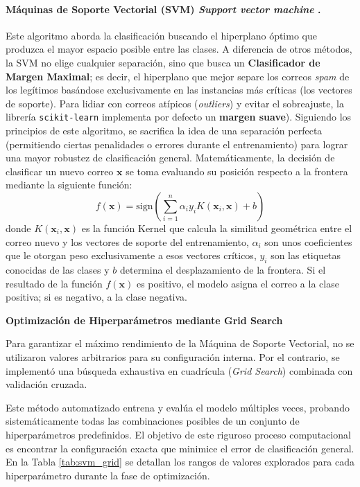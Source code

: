 \documentclass[a4paper,11pt]{book}
\begin{document}
\paragraph{Máquinas de Soporte Vectorial (SVM) \textit{Support vector machine  }.} Este algoritmo aborda la clasificación buscando el hiperplano óptimo que produzca el mayor espacio posible entre las clases. A diferencia de otros métodos, la SVM no elige cualquier separación, sino que busca un \textbf{Clasificador de Margen Maximal}; es decir, el hiperplano que mejor separe los correos \textit{spam} de los legítimos basándose exclusivamente en las instancias más críticas (los vectores de soporte).
Para lidiar con correos atípicos (\textit{outliers}) y evitar el sobreajuste, la librería \texttt{scikit-learn} implementa por defecto un \textbf{margen suave}). Siguiendo los principios de este algoritmo, se sacrifica la idea de una separación perfecta (permitiendo ciertas penalidades o errores durante el entrenamiento) para lograr una mayor robustez de clasificación general.
Matemáticamente, la decisión de clasificar un nuevo correo $\boldsymbol{x}$ se toma evaluando su posición respecto a la frontera mediante la siguiente función:
\begin{equation}
f(\boldsymbol{x}) = \text{sign}\left( \sum_{i=1}^{n} \alpha_i y_i K(\boldsymbol{x}_i, \boldsymbol{x}) + b \right)
\label{eq:svm_decision}
\end{equation}
donde $K(\boldsymbol{x}_i, \boldsymbol{x})$ es la función Kernel que calcula la similitud geométrica entre el correo nuevo y los vectores de soporte del entrenamiento, $\alpha_i$ son unos coeficientes que le otorgan peso exclusivamente a esos vectores críticos, $y_i$ son las etiquetas conocidas de las clases y $b$ determina el desplazamiento de la frontera. Si el resultado de la función $f(\boldsymbol{x})$ es positivo, el modelo asigna el correo a la clase positiva; si es negativo, a la clase negativa.

\vspace{0.5cm}
\noindent \textbf{Optimización de Hiperparámetros mediante Grid Search}

Para garantizar el máximo rendimiento de la Máquina de Soporte Vectorial, no se utilizaron valores arbitrarios para su configuración interna. Por el contrario, se implementó una búsqueda exhaustiva en cuadrícula (\textit{Grid Search}) combinada con validación cruzada. 

Este método automatizado entrena y evalúa el modelo múltiples veces, probando sistemáticamente todas las combinaciones posibles de un conjunto de hiperparámetros predefinidos. El objetivo de este riguroso proceso computacional es encontrar la configuración exacta que minimice el error de clasificación general. En la Tabla \ref{tab:svm_grid} se detallan los rangos de valores explorados para cada hiperparámetro durante la fase de optimización.
\end{document}
